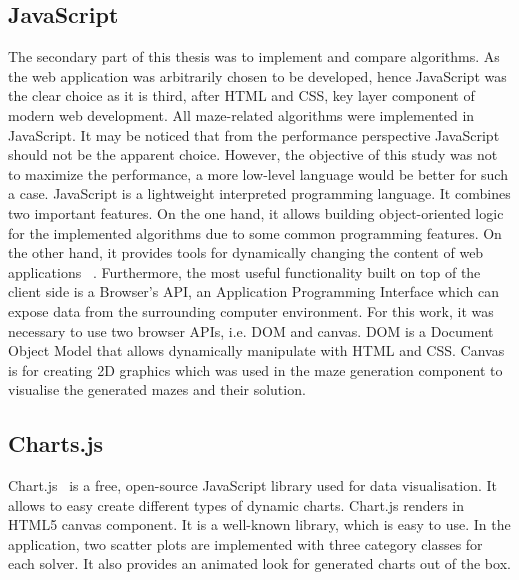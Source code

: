 \subsection{JavaScript}
The secondary part of this thesis was to implement and compare algorithms. As the web application was arbitrarily chosen to be developed, hence JavaScript was the 
clear choice as it is third, after HTML and CSS, key layer component of modern web development. All maze-related algorithms were implemented in JavaScript.
It may be noticed that from the performance perspective JavaScript should not be the apparent choice. However, the objective of this study was not to maximize
the performance, a more low-level language would be better for such a case. JavaScript is a lightweight interpreted programming language. 
It combines two important features. On the one hand, it allows building object-oriented logic for the implemented algorithms due to some common programming
features. On the other hand, it provides tools for dynamically changing the content of web applications ~\cite{29}. Furthermore, the most useful functionality built on top
of the client side is a Browser's API, an Application Programming Interface which can expose data from the surrounding computer environment. For this work, it was necessary to use two browser APIs, i.e. DOM and canvas. DOM is a Document Object Model that allows dynamically manipulate with HTML and CSS.
Canvas is for creating 2D graphics which was used in the maze generation component to visualise the generated mazes and their solution. 
\subsection{Charts.js}
Chart.js~\cite{30} is a free, open-source JavaScript library used for data visualisation. It allows to easy create different types of dynamic charts. Chart.js renders in 
HTML5 canvas component. It is a well-known library, which is easy to use. In the application, two scatter plots are implemented with three category classes 
for each solver. It also provides an animated look for generated charts out of the box.
